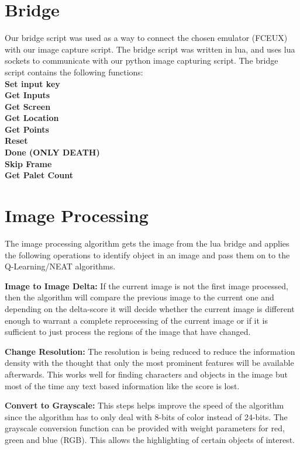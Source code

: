 \documentclass[12pt,journal,compsoc]{IEEEtran}
\begin{document}
\section{Bridge}
Our bridge script was used as a way to connect the chosen emulator (FCEUX) with our image capture script. The bridge script was written in lua, and uses lua sockets to communicate with our python image capturing script. The bridge script contains the following functions:\\
\textbf{Set input key}\\
\textbf{Get Inputs}\\
\textbf{Get Screen}\\
\textbf{Get Location}\\
\textbf{Get Points}\\
\textbf{Reset}\\
\textbf{Done (ONLY DEATH)}\\
\textbf{Skip Frame}\\
\textbf{Get Palet Count}

\section{Image Processing}
The image processing algorithm gets the image from the lua bridge and applies the following operations to identify object in an image and pass them on to the Q-Learning/NEAT algorithms.

\textbf{Image to Image Delta:}
If the current image is not the first image processed, then the algorithm will compare the previous image to the current one and depending on the delta-score it will decide whether the current image is different enough to warrant a complete reprocessing of the current image or if it is sufficient to just process the regions of the image that have changed.

\textbf{Change Resolution:}
The resolution is being reduced to reduce the information density with the thought that only the most prominent features will be available afterwards. This works well for finding characters and objects in the image but most of the time any text based information like the score is lost.

\textbf{Convert to Grayscale:}
This steps helps improve the speed of the algorithm since the algorithm has to only deal with 8-bits of color instead of 24-bits. The grayscale conversion function can be provided with weight parameters for red, green and blue (RGB). This allows the highlighting of certain objects of interest.
\end{document}

